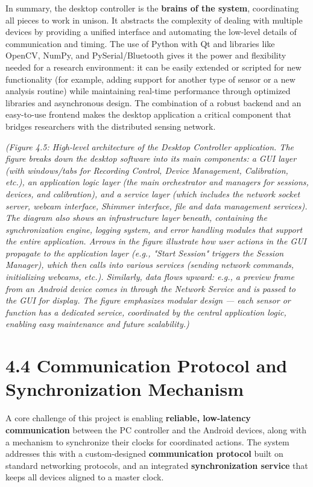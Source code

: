 \documentclass[11pt,a4paper]{report}
\begin{document}
In summary, the desktop controller is the \textbf{brains of the system},
coordinating all pieces to work in unison. It abstracts the complexity
of dealing with multiple devices by providing a unified interface and
automating the low-level details of communication and timing. The use of
Python with Qt and libraries like OpenCV, NumPy, and PySerial/Bluetooth
gives it the power and flexibility needed for a research environment: it
can be easily extended or scripted for new functionality (for example,
adding support for another type of sensor or a new analysis routine)
while maintaining real-time performance through optimized libraries and
asynchronous design. The combination of a robust backend and an
easy-to-use frontend makes the desktop application a critical component
that bridges researchers with the distributed sensing network.

\textit{(Figure 4.5: High-level architecture of the Desktop Controller
application. The figure breaks down the desktop software into its main
components: a} \textit{GUI layer} \textit{(with windows/tabs for Recording Control,
Device Management, Calibration, etc.), an} \textit{application logic layer}
\textit{(the main orchestrator and managers for sessions, devices, and
calibration), and a} \textit{service layer} \textit{(which includes the network socket
server, webcam interface, Shimmer interface, file and data management
services). The diagram also shows an} \textit{infrastructure layer} \textit{beneath,
containing the synchronization engine, logging system, and error
handling modules that support the entire application. Arrows in the
figure illustrate how user actions in the GUI propagate to the
application layer (e.g., "Start Session" triggers the Session Manager),
which then calls into various services (sending network commands,
initializing webcams, etc.). Similarly, data flows upward: e.g., a
preview frame from an Android device comes in through the Network
Service and is passed to the GUI for display. The figure emphasizes
modular design --- each sensor or function has a dedicated service,
coordinated by the central application logic, enabling easy maintenance
and future scalability.)}

\section{4.4 Communication Protocol and Synchronization Mechanism}

A core challenge of this project is enabling \textbf{reliable, low-latency
communication} between the PC controller and the Android devices, along
with a mechanism to synchronize their clocks for coordinated actions.
The system addresses this with a custom-designed \textbf{communication
protocol} built on standard networking protocols, and an integrated
\textbf{synchronization service} that keeps all devices aligned to a master
clock.
\end{document}
